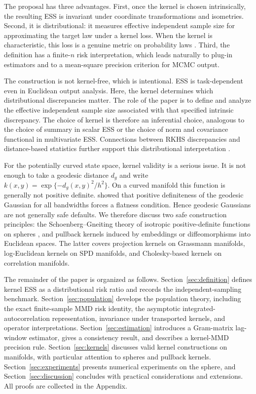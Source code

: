 \documentclass[11pt]{article}
\newcommand{\1}{\mathbf{1}}
\begin{document}
The proposal has three advantages. First, once the kernel is chosen intrinsically, the resulting ESS is invariant under coordinate transformations and isometries. Second, it is distributional: it measures effective independent sample size for approximating the target law under a kernel loss. When the kernel is characteristic, this loss is a genuine metric on probability laws \citep{sriperumbudur_2011_UniversalityCharacteristicKernels}. Third, the definition has a finite-$n$ risk interpretation, which leads naturally to plug-in estimators and to a mean-square precision criterion for MCMC output.

The construction is not kernel-free, which is intentional. ESS is task-dependent even in Euclidean output analysis. Here, the kernel determines which distributional discrepancies matter. The role of the paper is to define and analyze the effective independent sample size associated with that specified intrinsic discrepancy. The choice of kernel is therefore an inferential choice, analogous to the choice of summary in scalar ESS or the choice of norm and covariance functional in multivariate ESS. Connections between RKHS discrepancies and distance-based statistics further support this distributional interpretation \citep{sejdinovic_2013_EquivalenceDistancebasedRKHSbased}.

For the potentially curved state space, kernel validity is a serious issue. It is not enough to take a geodesic distance $d_g$ and write
$
k(x,y)=\exp\{-d_g(x,y)^2/h^2\}.
$
On a curved manifold this function is generally not positive definite. \citet{feragen_2015_GeodesicExponentialKernels} showed that positive definiteness of the geodesic Gaussian for all bandwidths forces a flatness condition. Hence geodesic Gaussians are not generally safe defaults. We therefore discuss two safe construction principles: the Schoenberg--Gneiting theory of isotropic positive-definite functions on spheres \citep{schoenberg_1942_PositiveDefiniteFunctions, gneiting_2013_StrictlyNonstrictlyPositive}, and pullback kernels induced by embeddings or diffeomorphisms into Euclidean spaces. The latter covers projection kernels on Grassmann manifolds, log-Euclidean kernels on SPD manifolds, and Cholesky-based kernels on correlation manifolds.


The remainder of the paper is organized as follows.  Section~\ref{sec:definition} defines kernel ESS as a distributional risk ratio and records the independent-sampling benchmark.  Section~\ref{sec:population} develops the population theory, including the exact finite-sample MMD risk identity, the asymptotic integrated-autocorrelation representation, invariance under transported kernels, and operator interpretations.  Section~\ref{sec:estimation} introduces a Gram-matrix lag-window estimator, gives a consistency result, and describes a kernel-MMD precision rule.  Section~\ref{sec:kernels} discusses valid kernel constructions on manifolds, with particular attention to spheres and pullback kernels.  Section~\ref{sec:experiments} presents numerical experiments on the sphere, and Section~\ref{sec:discussion} concludes with practical considerations and extensions.  All proofs are collected in the Appendix.
\end{document}
